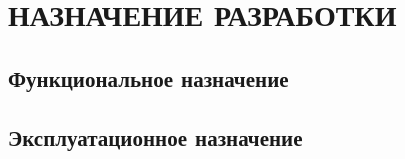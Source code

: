 \section{НАЗНАЧЕНИЕ РАЗРАБОТКИ}

\subsection{Функциональное назначение}

\subsection{Эксплуатационное назначение}

\clearpage